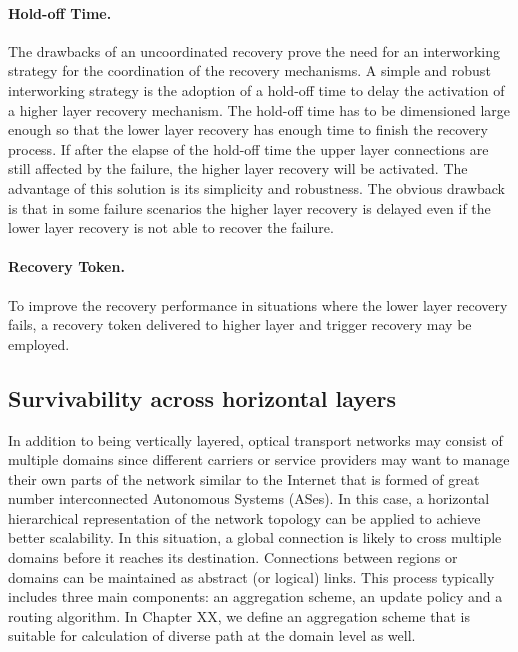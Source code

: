 \paragraph{Hold-off Time.}

The drawbacks of an uncoordinated recovery prove the need for an interworking
strategy for the coordination of the recovery mechanisms. A simple
and robust interworking strategy is the adoption of a hold-off time
to delay the activation of a higher layer recovery mechanism. The
hold-off time has to be dimensioned large enough so that the lower
layer recovery has enough time to finish the recovery process. If
after the elapse of the hold-off time the upper layer connections
are still affected by the failure, the higher layer recovery will
be activated. The advantage of this solution is its simplicity and
robustness. The obvious drawback is that in some failure scenarios
the higher layer recovery is delayed even if the lower layer recovery
is not able to recover the failure.


\paragraph{Recovery Token.}

To improve the recovery performance in situations where the lower
layer recovery fails, a recovery token delivered to higher layer and
trigger recovery may be employed.


\subsection{Survivability across horizontal layers}

In addition to being vertically layered, optical transport networks
may consist of multiple domains since different carriers or service
providers may want to manage their own parts of the network similar
to the Internet that is formed of great number interconnected Autonomous
Systems (ASes). In this case, a horizontal hierarchical representation
of the network topology can be applied to achieve better scalability.
In this situation, a global connection is likely to cross multiple
domains before it reaches its destination. Connections between regions
or domains can be maintained as abstract (or logical) links. This
process typically includes three main components: an aggregation scheme,
an update policy and a routing algorithm. In Chapter XX, we define
an aggregation scheme that is suitable for calculation of diverse
path at the domain level as well.

